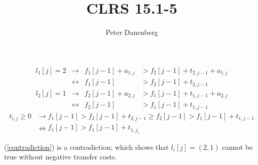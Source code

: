 \documentclass{article}
\title{CLRS 15.1-5}
\author{Peter Danenberg}
\begin{document}
\maketitle
\begin{align}
  l_1[j]=2 &\to& f_1[j-1]+a_{1,j} &> f_2[j-1]+t_{2,j-1}+a_{1,j}\\
  &\leftrightarrow& f_1[j-1] &> f_2[j-1]+t_{2,j-1}\\
  l_2[j]=1 &\to& f_2[j-1]+a_{2,j} &> f_1[j-1]+t_{1,j-1}+a_{2,j}\\
  &\leftrightarrow& f_2[j-1] &> f_1[j-1]+t_{1,j-1}
\end{align}
\begin{align}
  t_{i,j} \geq 0 &\to f_1[j-1] > f_2[j-1]+t_{2,j-1} \geq f_2[j-1] > f_1[j-1] + t_{1,j-1} \\
  &\nleftrightarrow f_1[j-1] > f_1[j-1] + t_{1,j_1}\label{contradiction}
\end{align}

(\ref{contradiction}) is a contradiction; which shows that $l_i[j] =
(2, 1)$ cannot be true without negative transfer costs.
\end{document}
